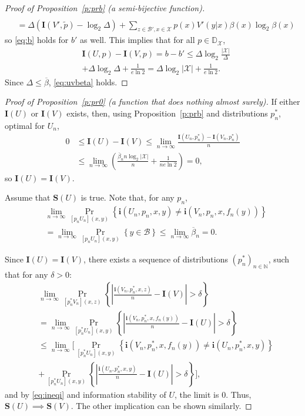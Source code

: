 \documentclass[journal, twocol]{IEEEtran}
\newcommand{\bfi}{{\mathbf{i}}}
\newcommand{\tp}{{\widetilde{p}}}
\newcommand{\mB}{{\mathcal{B}}}
\newcommand{\bD}{{\mathbb{D}}}
\newcommand{\bfI}{{\mathbf{I}}}
\newcommand{\bN}{{\mathbb{N}}}
\newcommand{\bfS}{{\mathbf{S}}}
\newcommand{\mX}{{\mathcal{X}}}
\newcommand{\abs}[1]{\left|{#1}\right|}
\newcommand{\set}[1]{{\left\{{#1}\right\}}}
\newcommand{\br}[1]{{\left({#1}\right)}}
\newcommand{\prob}[1]{\set{#1}}
\newcommand{\Probd}[2]{{\Pr_{#1}\prob{#2}}}
\newcommand{\obeta}{\overline{\beta}}
\newcommand{\pW}[2]{[{#1}{#2}]}
\begin{document}
\begin{appendices}
\begin{proof}[Proof of Proposition~\ref{p:prb} (a semi-bijective function)]
\begin{align*}
\\&
= \Delta\br{\bfI(V',\tp)-\log_2 \Delta}+\!\!\!\!\!\sum_{z\in\mB',x\in\mX}\!\!\!\!\!p(x)V'(y|x)\beta(x)\log_2 \beta(x)
\end{align*}
so \eqref{eq:b} holds for $b'$ as well.
This implies that for all $p\in\bD_\mX$,
\begin{align}
&\bfI(U,p)-\bfI(V,p) = b-b' \leq 
\Delta \log_2\frac{|\mX|}{\Delta}
\nonumber\\&+\Delta\log_2\Delta+\frac{1}{e\ln 2}
=\Delta \log_2|\mX|+\frac{1}{e\ln 2}.
\end{align}
Since $\Delta\leq \obeta$, \eqref{eq:uvbeta} holds.
\end{proof}

\begin{proof}[Proof of Proposition~\ref{p:pr0} (a function that does nothing almost surely)]
If either $\bfI(U)$ or $\bfI(V)$ exists, then, using Proposition~\ref{p:prb} and distributions $p^*_n$, optimal for $U_n$,
\begin{align*}
0&\leq\bfI(U)-\bfI(V)\leq\lim_{n\to\infty}\frac{\bfI(U_n,p^*_n)-\bfI(V_n,p^*_n)}{n}
\\&
\leq\lim_{n\to\infty}\br{\frac{\obeta_nn\log_2|\mX|}{n}+\frac{1}{ne\ln 2}}=0,
\end{align*}
so $\bfI(U)=\bfI(V)$.

Assume that $\bfS(U)$ is true.
Note that, for any $p_n$,
\begin{align}
&\lim_{n\to\infty}\Probd{\pW{p_n}{U_n}(x,y)}{\bfi(U_n,p_n,x,y)\neq \bfi(V_n,p_n,x,f_n(y))}
\nonumber\\&=    \lim_{n\to\infty}\Probd{\pW{p_n}{U_n}(x,y)}{y\in\mB}
\leq \lim_{n\to\infty}\obeta_n=0.
\label{eq:ineqi}
\end{align}

Since $\bfI(U)=\bfI(V)$, there exists a sequence of distributions $(p^*_n)_{n\in\bN}$, such that for any $\delta>0$:
{\allowdisplaybreaks
\begin{align}
&\lim_{n\to\infty}\Probd{\pW{p^*_n}{V_n}(x,z)}{\abs{\frac{\bfi(V_n,p^*_n,x,z)}{n}-\bfI(V)}>\delta}
\nonumber\\&
=\lim_{n\to\infty}\Probd{\pW{p^*_n}{U_n}(x,y)}{\abs{\frac{\bfi(V_n,p^*_n,x,f_n(y))}{n}-\bfI(U)}>\delta}
\nonumber\\&
\leq \lim_{n\to\infty}\bigg[\Probd{\pW{p^*_n}{U_n}(x,y)}{\bfi(V_n,p^*_n,x,f_n(y))\neq \bfi(U_n,p^*_n,x,y)}
\nonumber\\&
+\Probd{\pW{p^*_n}{U_n}(x,y)}{\abs{\frac{\bfi(U_n,p^*_n,x,y)}{n}-\bfI(U)}>\delta}\bigg],
\end{align}
}%
and by \eqref{eq:ineqi} and information stability of $U$, the limit is $0$.
Thus, $\bfS(U)\implies \bfS(V)$.
The other implication can be shown similarly.


\end{proof}
\end{appendices}
\end{document}
